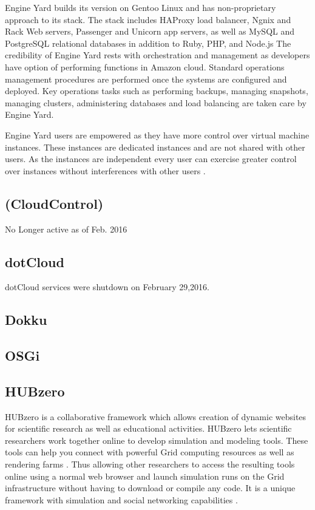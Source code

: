     Engine Yard builds its version on Gentoo Linux and has
    non-proprietary approach to its stack. The stack includes HAProxy
    load balancer, Ngnix and Rack Web servers, Passenger and Unicorn
    app servers, as well as MySQL and PostgreSQL relational databases
    in addition to Ruby, PHP, and Node.js The credibility of Engine
    Yard rests with orchestration and management as developers have
    option of performing functions in Amazon cloud. Standard
    operations management procedures are performed once the systems
    are configured and deployed. Key operations tasks such as
    performing backups, managing snapshots, managing clusters,
    administering databases and load balancing are taken care by
    Engine Yard.
    
    Engine Yard users are empowered as they have more control over
    virtual machine instances. These instances are dedicated instances
    and are not shared with other users. As the instances are
    independent every user can exercise greater control over instances
    without interferences with other users \cite{www-engineyard}.

\subsection{(CloudControl)}

    No Longer active as of Feb. 2016 \cite{www-wiki}

\subsection{dotCloud \cite{www-dotCloud}}

    dotCloud services were shutdown on February 29,2016.
    

\subsection{Dokku}
\subsection{OSGi}
\subsection{HUBzero}
     
     HUBzero is a collaborative framework which allows creation of
     dynamic websites for scientific research as well as educational
     activities.  HUBzero lets scientific researchers work together
     online to develop simulation and modeling tools.  These tools can
     help you connect with powerful Grid computing resources as well
     as rendering farms \cite{hubzerowebsite}. Thus allowing other
     researchers to access the resulting tools online using a normal
     web browser and launch simulation runs on the Grid infrastructure
     without having to download or compile any code. It is a unique
     framework with simulation and social networking
     capabilities \cite{hubzeropaper2010}.

